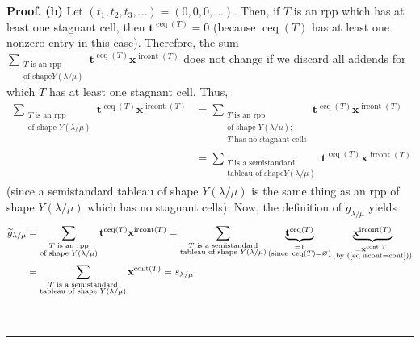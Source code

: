 \documentclass[numbers=enddot,12pt,final,onecolumn,notitlepage]{scrartcl}%
\theoremstyle{definition}
\newenvironment{proof}[1][Proof]{\noindent\textbf{#1.} }{\ \rule{0.5em}{0.5em}}
\newenvironment{vershort}{}{}
\let\sumnonlimits\sum
\renewcommand{\sum}{\sumnonlimits\limits}
\begin{document}
\begin{proof}
\begin{vershort}
\textbf{(b)} Let $\left(  t_{1},t_{2},t_{3},\ldots\right)  =\left(
0,0,0,\ldots\right)  $. Then, if $T$ is an rpp which has at least one stagnant
cell, then $\mathbf{t}^{\operatorname*{ceq}\left(  T\right)  }=0$ (because
$\operatorname*{ceq}\left(  T\right)  $ has at least one nonzero entry in this
case). Therefore, the sum $\sum_{\substack{T\text{ is an rpp}\\\text{of shape
}Y\left(  \lambda/\mu\right)  }}\mathbf{t}^{\operatorname*{ceq}\left(
T\right)  }\mathbf{x}^{\operatorname*{ircont}\left(  T\right)  }$ does not
change if we discard all addends for which $T$ has at least one stagnant cell.
Thus,%
\begin{align*}
\sum_{\substack{T\text{ is an rpp}\\\text{of shape }Y\left(  \lambda
/\mu\right)  }}\mathbf{t}^{\operatorname*{ceq}\left(  T\right)  }%
\mathbf{x}^{\operatorname*{ircont}\left(  T\right)  }  &  =\sum
_{\substack{T\text{ is an rpp}\\\text{of shape }Y\left(  \lambda/\mu\right)
;\\T\text{ has no stagnant cells}}}\mathbf{t}^{\operatorname*{ceq}\left(
T\right)  }\mathbf{x}^{\operatorname*{ircont}\left(  T\right)  }\\
&  =\sum_{\substack{T\text{ is a semistandard}\\\text{tableau of shape
}Y\left(  \lambda/\mu\right)  }}\mathbf{t}^{\operatorname*{ceq}\left(
T\right)  }\mathbf{x}^{\operatorname*{ircont}\left(  T\right)  }%
\end{align*}
(since a semistandard tableau of shape $Y\left(  \lambda/\mu\right)  $ is the
same thing as an rpp of shape $Y\left(  \lambda/\mu\right)  $ which has no
stagnant cells). Now, the definition of $\widetilde{g}_{\lambda/\mu}$ yields%
\begin{align*}
\widetilde{g}_{\lambda/\mu}  &  =\sum_{\substack{T\text{ is an rpp}\\\text{of
shape }Y\left(  \lambda/\mu\right)  }}\mathbf{t}^{\operatorname*{ceq}\left(
T\right)  }\mathbf{x}^{\operatorname*{ircont}\left(  T\right)  }%
=\sum_{\substack{T\text{ is a semistandard}\\\text{tableau of shape }Y\left(
\lambda/\mu\right)  }}\underbrace{\mathbf{t}^{\operatorname*{ceq}\left(
T\right)  }}_{\substack{=1\\\text{(since }\operatorname*{ceq}\left(  T\right)
=\varnothing\text{)}}}\underbrace{\mathbf{x}^{\operatorname*{ircont}\left(
T\right)  }}_{\substack{=\mathbf{x}^{\operatorname*{cont}\left(  T\right)
}\\\text{(by (\ref{eq.ircont=cont}))}}}\\
&  =\sum_{\substack{T\text{ is a semistandard}\\\text{tableau of shape
}Y\left(  \lambda/\mu\right)  }}\mathbf{x}^{\operatorname*{cont}\left(
T\right)  }=s_{\lambda/\mu}.
\end{align*}


\end{vershort}
\end{proof}
\end{document}
